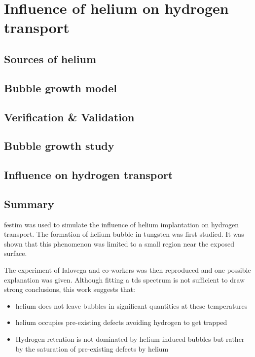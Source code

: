 \setchapterpreamble[u]{\margintoc}
\chapter{Influence of helium on hydrogen transport}
\label{Chapter5} %



\section{Sources of helium}


\section{Bubble growth model}


\section{Verification \& Validation}


\section{Bubble growth study}


\section{Influence on hydrogen transport}


\section{Summary}

\gls{festim} was used to simulate the influence of helium implantation on hydrogen transport.
The formation of helium bubble in tungsten was first studied.
It was shown that this phenomenon was limited to a small region near the exposed surface.

The experiment of Ialovega and co-workers  was then reproduced and one possible explanation was given.
Although fitting a \gls{tds} spectrum is not sufficient to draw strong conclusions, this work suggests that:
\begin{itemize}
    \item helium does not leave bubbles in significant quantities at these temperatures
    \item helium occupies pre-existing defects avoiding hydrogen to get trapped
    \item Hydrogen retention is not dominated by helium-induced bubbles but rather by the saturation of pre-existing defects by helium
\end{itemize}


